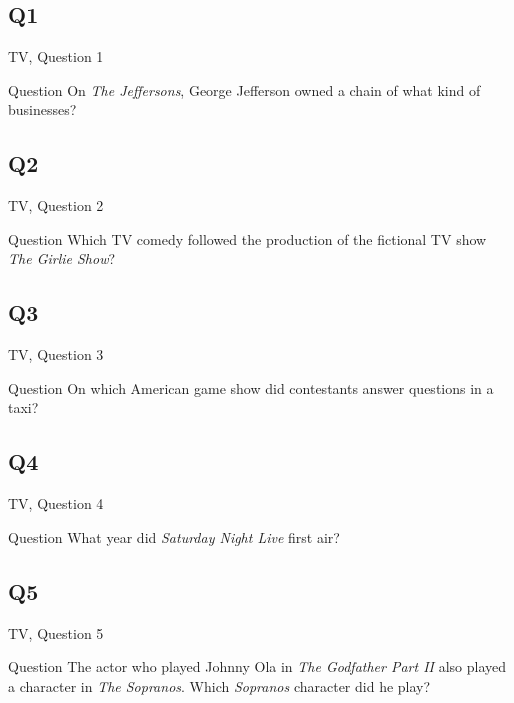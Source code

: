 \documentclass[11pt]{beamer}
\begin{document}
\subsection*{Q1}
\begin{frame}[t]{TV, Question 1}
\begin{block}{Question}
On \emph{The Jeffersons}, George Jefferson owned a chain of what kind of businesses?
\end{block}
\end{frame}
\subsection*{Q2}
\begin{frame}[t]{TV, Question 2}
\begin{block}{Question}
Which TV comedy followed the production of the fictional TV show \emph{The Girlie Show}?
\end{block}
\end{frame}
\subsection*{Q3}
\begin{frame}[t]{TV, Question 3}
\begin{block}{Question}
On which American game show did contestants answer questions in a taxi?
\end{block}
\end{frame}
\subsection*{Q4}
\begin{frame}[t]{TV, Question 4}
\begin{block}{Question}
What year did \emph{Saturday Night Live} first air?
\end{block}
\end{frame}
\subsection*{Q5}
\begin{frame}[t]{TV, Question 5}
\begin{block}{Question}
The actor who played Johnny Ola in \emph{The Godfather Part II} also played a character in \emph{The Sopranos}. Which \emph{Sopranos} character did he play?
\end{block}
\end{frame}
\end{document}
